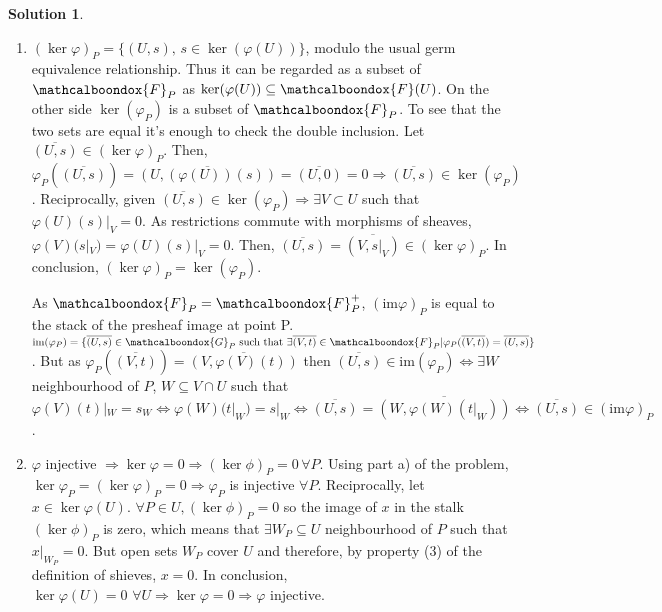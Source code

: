 \documentclass[12pt]{article}
\newcommand{\imp}{\ensuremath{\Rightarrow}}
\newcommand{\ima}{\ensuremath{\mathrm{im}}}
\theoremstyle{definition}
\newtheorem*{sol}{Solution}
\newcommand{\sF}{\ensuremath{\mathcalboondox{F}}}
\newcommand{\sG}{\ensuremath{\mathcalboondox{G}}}
\begin{document}
\begin{sol}
	\begin{enumerate}[label=\alph*)]
		\item $(\ker \varphi)_P = \{(U,s), \, s \in \ker(\varphi(U))\}$, modulo the usual germ equivalence relationship. Thus it can be regarded as a subset of $\sF_P$ as $\ker(\varphi(U)) \subseteq \sF(U)$. On the other side $\ker(\varphi_P)$ is a subset of $\sF_P$. To see that the two sets are equal it's enough to check the double inclusion. Let $\overline{(U,s)} \in (\ker \varphi)_P$. Then, $\varphi_P(\overline{(U,s)}) = \overline{(U, (\varphi(U))(s))} = \overline{(U,0)} = 0 \imp \overline{(U,s)} \in \ker(\varphi_P)$. Reciprocally, given $\overline{(U,s)} \in \ker(\varphi_P) \imp \exists V \subset U$ such that $\varphi(U)(s)|_V = 0$. As restrictions commute with morphisms of sheaves, $ \varphi(V)(s|_V) = \varphi(U)(s)|_V = 0$. Then, $\overline{(U,s)} = \overline{(V,s|_V)} \in (\ker\varphi)_P$. In conclusion, $(\ker \varphi)_P = \ker(\varphi_P)$.

		As $\sF_P = \sF^{+}_P$, $(\ima \varphi)_P$ is equal to the stack of the presheaf image at point P. $\ima (\varphi_P) = \{\overline{(U,s)} \in \sG_P \text{ such that } \exists \overline{(V,t)} \in \sF_P | \varphi_P(\overline{(V,t)}) = \overline{(U,s)}\}$. But as $\varphi_P(\overline{(V,t)}) = \overline{(V, \varphi(V)(t))}$ then $\overline{(U,s)} \in \ima (\varphi_P) \iff \exists W$ neighbourhood of $P$, $W \subseteq V \cap U$ such that $\varphi(V)(t)|_W = s_W \iff \varphi(W)(t|_W) = s|_W \iff \overline{(U,s)} = \overline{(W,\varphi(W)(t|_W))} \iff \overline{(U,s)} \in (\ima \varphi)_P$.

		\item $\varphi$ injective $\imp \ker \varphi = 0 \imp (\ker \phi)_P = 0 \, \forall P$. Using part a) of the problem, $\ker \varphi_P = (\ker \varphi)_P = 0 \imp \varphi_P$ is injective $\forall P$. Reciprocally, let $x \in \ker \varphi(U)$. $\forall P \in U, (\ker \phi)_P = 0$ so the image of $x$ in the stalk $(\ker \phi)_P$ is zero, which means that $\exists W_P \subseteq U$ neighbourhood of $P$ such that $x|_{W_P} = 0$. But open sets $W_P$ cover $U$ and therefore, by property (3) of the definition of shieves, $x = 0$. In conclusion, $\ker \varphi(U) = 0 \, \, \forall U \imp \ker \varphi = 0 \imp \varphi$ injective.


\end{enumerate}
\end{sol}
\end{document}
